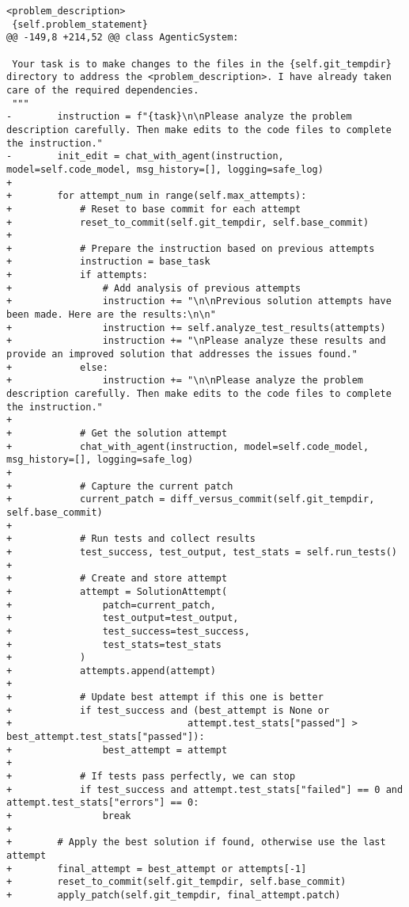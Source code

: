 \begin{lstlisting}[style=diffstyle]
 <problem_description>
 {self.problem_statement}
@@ -149,8 +214,52 @@ class AgenticSystem:
 
 Your task is to make changes to the files in the {self.git_tempdir} directory to address the <problem_description>. I have already taken care of the required dependencies.
 """
-        instruction = f"{task}\n\nPlease analyze the problem description carefully. Then make edits to the code files to complete the instruction."
-        init_edit = chat_with_agent(instruction, model=self.code_model, msg_history=[], logging=safe_log)
+
+        for attempt_num in range(self.max_attempts):
+            # Reset to base commit for each attempt
+            reset_to_commit(self.git_tempdir, self.base_commit)
+            
+            # Prepare the instruction based on previous attempts
+            instruction = base_task
+            if attempts:
+                # Add analysis of previous attempts
+                instruction += "\n\nPrevious solution attempts have been made. Here are the results:\n\n"
+                instruction += self.analyze_test_results(attempts)
+                instruction += "\nPlease analyze these results and provide an improved solution that addresses the issues found."
+            else:
+                instruction += "\n\nPlease analyze the problem description carefully. Then make edits to the code files to complete the instruction."
+
+            # Get the solution attempt
+            chat_with_agent(instruction, model=self.code_model, msg_history=[], logging=safe_log)
+            
+            # Capture the current patch
+            current_patch = diff_versus_commit(self.git_tempdir, self.base_commit)
+            
+            # Run tests and collect results 
+            test_success, test_output, test_stats = self.run_tests()
+            
+            # Create and store attempt
+            attempt = SolutionAttempt(
+                patch=current_patch,
+                test_output=test_output,
+                test_success=test_success,
+                test_stats=test_stats
+            )
+            attempts.append(attempt)
+            
+            # Update best attempt if this one is better
+            if test_success and (best_attempt is None or 
+                               attempt.test_stats["passed"] > best_attempt.test_stats["passed"]):
+                best_attempt = attempt
+            
+            # If tests pass perfectly, we can stop
+            if test_success and attempt.test_stats["failed"] == 0 and attempt.test_stats["errors"] == 0:
+                break
+        
+        # Apply the best solution if found, otherwise use the last attempt
+        final_attempt = best_attempt or attempts[-1]
+        reset_to_commit(self.git_tempdir, self.base_commit)
+        apply_patch(self.git_tempdir, final_attempt.patch)
 

\end{lstlisting}
